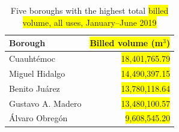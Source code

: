 \documentclass[runningheads]{llncs}
\newcommand{\nuevo}[1]{\colorbox{yellow}{#1}}
\renewcommand{\_}{\origunderscore\allowbreak}
\begin{document}
\begin{table}[tbp]
\centering
\caption{Five boroughs with the highest total \nuevo{billed volume, all uses, January--June 2019}}
\label{tab:top5_alcaldias}
\begin{tabular}{|l|r|}
\hline
\textbf{Borough} & \textbf{\nuevo{Billed volume (m$^3$)}} \\
\hline
Cuauht\'emoc & \nuevo{18,401,765.79} \\
Miguel Hidalgo & \nuevo{14,490,397.15} \\
Benito Ju\'arez & \nuevo{13,780,118.64} \\
Gustavo A. Madero & \nuevo{13,480,100.57} \\
\'Alvaro Obreg\'on & \nuevo{9,608,545.20} \\
\hline
\end{tabular}
\end{table}
\end{document}
